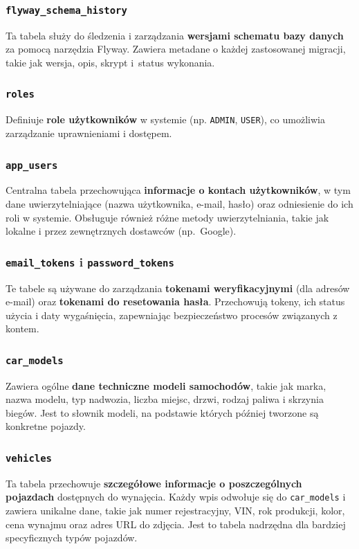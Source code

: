 \documentclass[12pt]{article}
\begin{document}
	\subsubsection{\texttt{flyway\_schema\_history}}
	Ta tabela służy do śledzenia i zarządzania \textbf{wersjami schematu bazy danych} za pomocą narzędzia Flyway. Zawiera metadane o każdej zastosowanej migracji, takie jak wersja, opis, skrypt i~status wykonania.
	
	\subsubsection{\texttt{roles}}
	Definiuje \textbf{role użytkowników} w systemie (np. \texttt{ADMIN}, \texttt{USER}), co umożliwia zarządzanie uprawnieniami i dostępem.
	
	\subsubsection{\texttt{app\_users}}
	Centralna tabela przechowująca \textbf{informacje o kontach użytkowników}, w tym dane uwierzytelniające (nazwa użytkownika, e-mail, hasło) oraz odniesienie do ich roli w systemie. Obsługuje również różne metody uwierzytelniania, takie jak lokalne i przez zewnętrznych dostawców (np.~Google).
	
	\subsubsection{\texttt{email\_tokens} i \texttt{password\_tokens}}
	Te tabele są używane do zarządzania \textbf{tokenami weryfikacyjnymi} (dla adresów e-mail) oraz \textbf{tokenami do resetowania hasła}. Przechowują tokeny, ich status użycia i daty wygaśnięcia, zapewniając bezpieczeństwo procesów związanych z kontem.
	
	\subsubsection{\texttt{car\_models}}
	Zawiera ogólne \textbf{dane techniczne modeli samochodów}, takie jak marka, nazwa modelu, typ nadwozia, liczba miejsc, drzwi, rodzaj paliwa i skrzynia biegów. Jest to słownik modeli, na podstawie których później tworzone są konkretne pojazdy.
	
	\subsubsection{\texttt{vehicles}}
	Ta tabela przechowuje \textbf{szczegółowe informacje o poszczególnych pojazdach} dostępnych do wynajęcia. Każdy wpis odwołuje się do \texttt{car\_models} i zawiera unikalne dane, takie jak numer rejestracyjny, VIN, rok produkcji, kolor, cena wynajmu oraz adres URL do zdjęcia. Jest to tabela nadrzędna dla bardziej specyficznych typów pojazdów.
	
\end{document}
